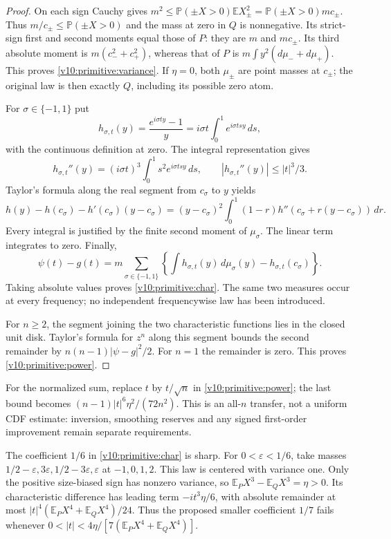 \documentclass[11pt,a4paper]{article}
\newcommand{\E}{\mathbb E}
\newcommand{\Pp}{\mathbb P}
\begin{document}
\begin{proof}
On each sign Cauchy gives
$m^2\le\Pp(\pm X>0)\E X_\pm^2
=\Pp(\pm X>0)mc_\pm$.
Thus $m/c_\pm\le\Pp(\pm X>0)$ and the mass at zero in $Q$ is
nonnegative. Its strict-sign first and second moments equal those of $P$:
they are $m$ and $mc_\pm$. Its third absolute moment is
$m(c_-^2+c_+^2)$, whereas that of $P$ is
$m\int y^2(d\mu_-+d\mu_+)$. This proves \eqref{v10:primitive:variance}.
If $\eta=0$, both $\mu_\pm$ are point masses at $c_\pm$; the original
law is then exactly $Q$, including its possible zero atom.

For $\sigma\in\{-1,1\}$ put
\[
 h_{\sigma,t}(y)=\frac{e^{i\sigma ty}-1}{y}
      =i\sigma t\int_0^1 e^{i\sigma tsy}\,ds,
\]
with the continuous definition at zero. The integral representation gives
\[
 h_{\sigma,t}''(y)=(i\sigma t)^3\int_0^1s^2e^{i\sigma tsy}\,ds,
 \qquad |h_{\sigma,t}''(y)|\le |t|^3/3.
\]
Taylor's formula along the real segment from $c_\sigma$ to $y$ yields
\[
 h(y)-h(c_\sigma)-h'(c_\sigma)(y-c_\sigma)
 =(y-c_\sigma)^2\int_0^1(1-r)
             h''(c_\sigma+r(y-c_\sigma))\,dr.
\]
Every integral is justified by the finite second moment of $\mu_\sigma$.
The linear term integrates to zero. Finally,
\[
 \psi(t)-g(t)=m\sum_{\sigma\in\{-1,1\}}
 \left\{\int h_{\sigma,t}(y)\,d\mu_\sigma(y)
                         -h_{\sigma,t}(c_\sigma)\right\}.
\]
Taking absolute values proves \eqref{v10:primitive:char}. The same two
measures occur at every frequency; no independent frequencywise law has
been introduced.

For $n\ge2$, the segment joining the two characteristic functions lies
in the closed unit disk. Taylor's formula for $z^n$ along this segment
bounds the second remainder by $n(n-1)|\psi-g|^2/2$.
For $n=1$ the remainder is zero. This proves \eqref{v10:primitive:power}.
\end{proof}

For the normalized sum, replace $t$ by $t/\sqrt n$ in
\eqref{v10:primitive:power}; the last bound becomes
$(n-1)|t|^6\eta^2/(72n^2)$. This is an all-$n$ transfer, not a
uniform CDF estimate: inversion, smoothing reserves and any signed
first-order improvement remain separate requirements.

The coefficient $1/6$ in \eqref{v10:primitive:char} is sharp. For
$0<\varepsilon<1/6$, take masses
$1/2-\varepsilon,3\varepsilon,1/2-3\varepsilon,\varepsilon$
at $-1,0,1,2$. This law is centered with variance one. Only the positive
size-biased sign has nonzero variance, so
$\E_P X^3-\E_Q X^3=\eta>0$. Its characteristic difference has leading
term $-it^3\eta/6$, with absolute remainder at most
$|t|^4(\E_P X^4+\E_Q X^4)/24$. Thus the proposed smaller coefficient
$1/7$ fails whenever
$0<|t|<4\eta/[7(\E_P X^4+\E_Q X^4)]$.
\end{document}
